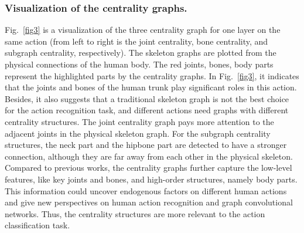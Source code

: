 \documentclass[runningheads]{llncs}
\begin{document}
\subsubsection{Visualization of the centrality graphs.}
Fig.~\ref{fig3} is a visualization of the three centrality graph for one layer on the same action (from left to right is the joint centrality, bone centrality, and subgraph centrality, respectively). The skeleton graphs are plotted from the physical connections of the human body. The red joints, bones, body parts represent the highlighted parts by the centrality graphs. In Fig.~\ref{fig3}, it indicates that the joints and bones of the human trunk play significant roles in this action. Besides, it also suggests that a traditional skeleton graph is not the best choice for the action recognition task, and different actions need graphs with different centrality structures. The joint centrality graph pays more attention to the adjacent joints in the physical skeleton graph. For the subgraph centrality structures, the neck part and the hipbone part are detected to have a stronger connection, although they are far away from each other in the physical skeleton. Compared to previous works, the centrality graphs further capture the low-level features, like key joints and bones, and high-order structures, namely body parts. This information could uncover endogenous factors on different human actions and give new perspectives on human action recognition and graph convolutional networks. Thus, the centrality structures are more relevant to the action classification task.
\end{document}
